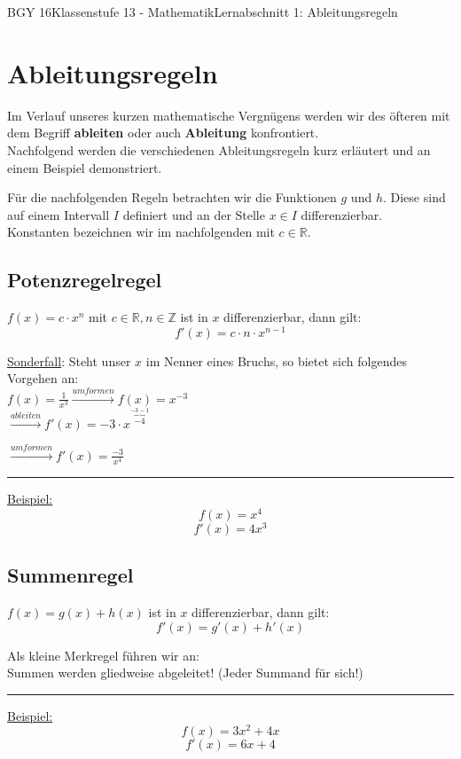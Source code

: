 \documentclass[11pt,twocolumn,oneside,openany,headings=optiontotoc,11pt,numbers=noenddot]{article}
\begin{document}
	\begin{worksheet}{BGY 16}{Klassenstufe 13 - Mathematik}{Lernabschnitt 1: Ableitungsregeln}
		
		\section{Ableitungsregeln}
		Im Verlauf unseres kurzen mathematische Vergnügens werden wir des öfteren mit dem Begriff \textbf{ableiten} oder auch \textbf{Ableitung} konfrontiert.\\
		Nachfolgend werden die verschiedenen Ableitungsregeln kurz erläutert und an einem Beispiel demonstriert.\\
		\par\noindent
		Für die nachfolgenden Regeln betrachten wir die Funktionen \(g\) und \(h\). Diese sind auf einem Intervall \(I\) definiert und an der Stelle \(x\in{}I\) differenzierbar.\\
		Konstanten bezeichnen wir im nachfolgenden mit \(c\in{}\mathbb{R}\).
		\begin{framed}
			\subsection{Potenzregelregel}
			\colorbox{green!10}{\(f(x) = c\cdot{}x^n\)} mit \(c\in{}\mathbb{R}, n\in{}\mathbb{Z}\) ist in \(x\) differenzierbar, dann gilt: \[f'(x) = c\cdot{}n\cdot{}x^{n-1}\]
			\par\noindent
			\underline{Sonderfall}: Steht unser \(x\) im Nenner eines Bruchs, so bietet sich folgendes Vorgehen an:\\
			\(f(x) = \frac{1}{x^3} \xrightarrow{umformen} f(x) = x^{-3}\)\\
			\(\xrightarrow{ableiten} f'(x) = -3\cdot{}x^{\overbrace{-4}^{-3-1}}\)\\
			\par\noindent
			\(\xrightarrow{umformen} f'(x) = \frac{-3}{x^4}\)
			\par\bigskip\noindent
			\rule{0.99\textwidth}{0.4pt}
			\underline{Beispiel:}\[f(x) = x^4\]\[f'(x) = 4x^3\]
		\end{framed}
		\begin{framed}
			\subsection{Summenregel}
			\noindent
			\colorbox{green!10}{\(f(x) = g(x) + h(x)\)} ist in \(x\) differenzierbar, dann gilt: \[f'(x) = g'(x) + h'(x)\]
			\par\noindent
			Als kleine Merkregel führen wir an:\\
			\indent{}Summen werden gliedweise abgeleitet! (Jeder Summand für sich!)
			\par\bigskip\noindent
			\rule{0.99\textwidth}{0.4pt}
			\underline{Beispiel:} \[f(x) = 3x^2 + 4x\]\[f'(x) = 6x + 4\]
		\end{framed}
		\begin{framed}

\end{framed}
\end{worksheet}
\end{document}
